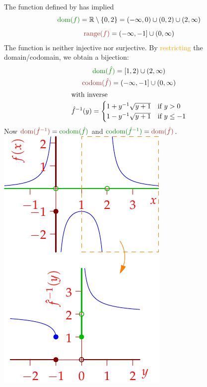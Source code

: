 \begin{example}[lower separated=false, sidebyside, sidebyside align=top seam, sidebyside gap=0pt, righthand width=0.32\linewidth]{}{}
The function defined by 
has implied
\begin{gather*}
\textcolor{Green}{\dom(f)}=\R\setminus\{0,2\}=(-\infty,0)\cup(0,2)\cup (2,\infty)\\[5pt]
\textcolor{Brown}{\range(f)}=(-\infty,-1]\cup(0,\infty)
\end{gather*}
The function is neither injective nor surjective.\smallbreak
By \textcolor{orange}{restricting} the domain/codomain, we obtain a bijection:
\begin{gather*}
\textcolor{Green}{\dom(\hat f)}=[1,2)\cup(2,\infty)\\
\textcolor{Brown}{\operatorname{codom}(\hat f)}=(-\infty,-1]\cup(0,\infty)\\
\intertext{with inverse}
\hat f^{-1}(y)=\begin{cases}
1+y^{-1}\sqrt{y+1}&\text{if }y>0\\
1-y^{-1}\sqrt{y+1}&\text{if }y\le -1
\end{cases}
\end{gather*}
Now $\textcolor{Brown}{\dom(\hat f^{-1})}=\textcolor{Green}{\operatorname{codom}(\hat f)}$ and $\textcolor{Green}{\operatorname{codom}(\hat f^{-1})}=\textcolor{Brown}{\dom(\hat f)}$.
\tcblower
\flushright\includegraphics{dom4}
\end{example}
\goodbreak


